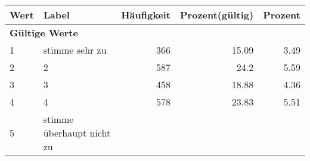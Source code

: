      \begin{longtable}{lXrrr}
     \toprule
     \textbf{Wert} & \textbf{Label} & \textbf{Häufigkeit} & \textbf{Prozent(gültig)} & \textbf{Prozent} \\
     \endhead
     \midrule
     \multicolumn{5}{l}{\textbf{Gültige Werte}}\\

     1 &
     \multicolumn{1}{X}{ stimme sehr zu   } &


       \num{366} &
       \num[round-mode=places,round-precision=2]{15.09} &
         \num[round-mode=places,round-precision=2]{3.49} \\

     2 &
     \multicolumn{1}{X}{ 2   } &


       \num{587} &
       \num[round-mode=places,round-precision=2]{24.2} &
         \num[round-mode=places,round-precision=2]{5.59} \\

     3 &
     \multicolumn{1}{X}{ 3   } &


       \num{458} &
       \num[round-mode=places,round-precision=2]{18.88} &
         \num[round-mode=places,round-precision=2]{4.36} \\

     4 &
     \multicolumn{1}{X}{ 4   } &


       \num{578} &
       \num[round-mode=places,round-precision=2]{23.83} &
         \num[round-mode=places,round-precision=2]{5.51} \\

     5 &
     \multicolumn{1}{X}{ stimme überhaupt nicht zu   } &



\end{longtable}
